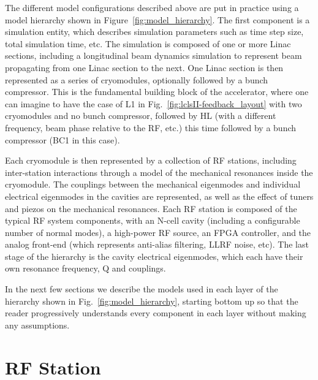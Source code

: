 \documentclass[a4paper,12pt]{article}
\begin{document}
The different model configurations described above are put in practice using a model hierarchy shown in Figure~\ref{fig:model_hierarchy}. The first component is a simulation entity, which describes simulation parameters such as time step size, total simulation time, etc. The simulation is composed of one or more Linac sections, including a longitudinal beam dynamics simulation to represent beam propagating from one Linac section to the next. One Linac section is then represented as a series of cryomodules, optionally followed by a bunch compressor. This is the fundamental building block of the accelerator, where one can imagine to have the case of L1 in Fig.~\ref{fig:lclsII-feedback_layout} with two cryomodules and no bunch compressor, followed by HL (with a different frequency, beam phase relative to the RF, etc.) this time followed by a bunch compressor (BC1 in this case).

Each cryomodule is then represented by a collection of RF stations, including inter-station interactions through a model of the mechanical resonances inside the cryomodule. The couplings between the mechanical eigenmodes and individual electrical eigenmodes in the cavities are represented, as well as the effect of tuners and piezos on the mechanical resonances. Each RF station is composed of the typical RF system components, with an N-cell cavity (including a configurable number of normal modes), a high-power RF source, an FPGA controller, and the analog front-end (which represents anti-alias filtering, LLRF noise, etc). The last stage of the hierarchy is the cavity electrical eigenmodes, which each have their own resonance frequency, Q and couplings.

In the next few sections we describe the models used in each layer of the hierarchy shown in Fig.~\ref{fig:model_hierarchy}, starting bottom up so that the reader progressively understands every component in each layer without making any assumptions.

\newpage

\section{RF Station}
\label{sec:rf_station}
\end{document}
